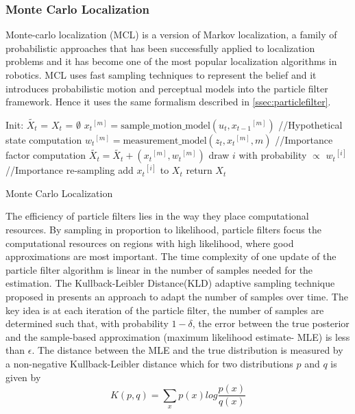 {\subsubsection{Monte Carlo Localization}
\label{ssec:montecarlo}
	Monte-carlo localization (MCL)\cite{fox1999monte} is a version of Markov localization, a family of probabilistic approaches that has been successfully applied to localization problems and it has become one of the most popular localization algorithms in robotics. MCL uses fast sampling techniques to represent the belief and it introduces probabilistic motion and perceptual models into the particle filter framework. Hence it uses the same formalism described in \ref{ssec:particlefilter}.\\  	
\begin{algorithm}
Init: {$\tilde{X_t}$ = $X_t$ = $\emptyset$ } \;
  { 
   ${x_t}^{[m]} = \text{sample\_motion\_model}(u_t,{x_{t-1}}^{[m]})$ //Hypothetical state computation\;
   ${w_t}^{[m]} = \text{measurement\_model}(z_t,{x_t}^{[m]},m)$ //Importance factor computation \; 
   $\tilde{X_t} = \tilde{X_t} + ({x_t}^{[m]},{w_t}^{[m]})$ \;
 }
  { 
   draw $i$ with probability $\varpropto$ ${w_t}^{[i]}$ //Importance re-sampling\;
   add ${x_t}^{[i]}$ to $X_t$ \;
 }
 return $X_t$
 \caption{Monte Carlo Localization}
 \label{alg:montecarlo}
\end{algorithm}

	The efficiency of particle filters lies in the way they place computational resources. By sampling in proportion to likelihood, particle filters focus the computational resources on regions with high likelihood, where good approximations are most important. The time complexity of one update of the particle filter algorithm is linear in the number of samples needed for the estimation. The Kullback-Leibler Distance(KLD) adaptive sampling technique proposed in \cite{fox2003adapting} presents an approach to adapt the number of samples over time. The key idea is at each iteration of the particle filter, the number of samples are determined such that, with probability $1-\delta$, the error between the true posterior and the sample-based approximation (maximum likelihood estimate- MLE) is less than $\epsilon$. The distance between the MLE and the true distribution is measured by a non-negative Kullback-Leibler distance which for two distributions $p$ and $q$ is given by
\begin{equation}
K(p,q) = \sum_{x} p(x)log{\frac{p(x)}{q(x)}}
\end{equation}

}
